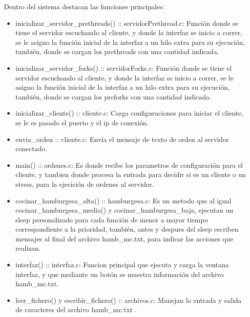\documentclass{article}
\begin{document}
Dentro del sistema destacan las funciones principales:
\begin{itemize}
        \item inicializar\_servidor\_prethreads() :: servidorPrethread.c: Función donde se tiene el servidor escuchando al cliente, y donde la interfaz se inicio a correr, se le asigno la función inicial de la interfaz a un hilo extra para su ejecución, también, donde se cargan los prethreads con una cantidad indicada.
        \item inicializar\_servidor\_forks() :: servidorForks.c: Función donde se tiene el servidor escuchando al cliente, y donde la interfaz se inicio a correr, se le asigno la función inicial de la interfaz a un hilo extra para su ejecución, también, donde se cargan los preforks con una cantidad indicada.
        \item inicializar\_cliente() :: cliente.c: Carga configuraciones para iniciar el cliente, se le es pasado el puerto y el ip de conexión.
        \item envia\_orden :: cliente.c: Envía el mensaje de texto de orden al servidor conectado.
        \item main() :: ordenes.c: Es donde recibe los parametros de configuración para el cliente, y tambien donde procesa la entrada para decidir si es un cliente o un stress, para la ejecición de ordenes al servidor.
        \item cocinar\_hamburgesa\_alta() :: hamburgesa.c: Es un metodo que al igual cocinar\_hamburgesa\_media() y cocinar\_hamburgesa\_baja, ejecutan un sleep personalizado para cada función de menor a mayor tiempo correspondiente a la prioridad, también, antes y despues del sleep escriben mensajes al final del archivo hamb\_mc.txt, para indicar las acciones que realizan.
        \item interfaz() :: interfaz.c: Funcion principal que ejecuta y carga la ventana interfaz, y que mediante un botón se muestra información del archivo hamb\_mc.txt.
        \item leer\_fichero() y escribir\_fichero() :: archivos.c: Manejan la entrada y salida de caracteres del archivo hamb\_mc.txt .
        
    \end{itemize}
\end{document}
